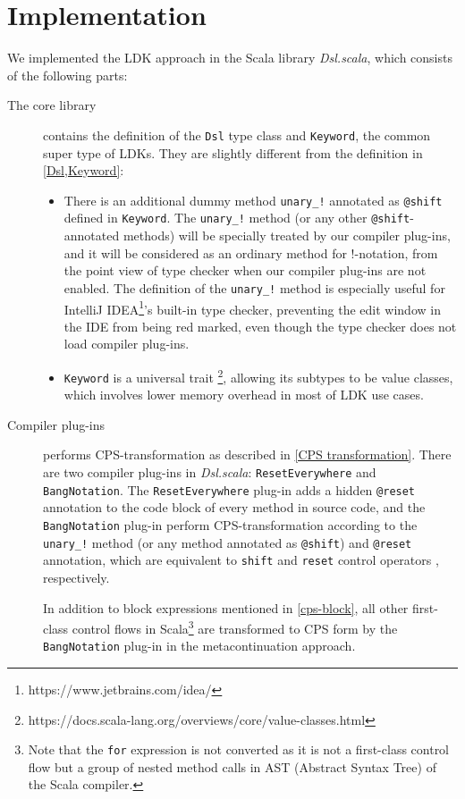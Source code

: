 \section{Implementation}\label{Implementation}

We implemented the LDK approach in the Scala library \textit{Dsl.scala}, which consists of the following parts:

\begin{description}
  \item[The core library] contains the definition of the \lstinline{Dsl} type class and \lstinline{Keyword}, the common super type of LDKs. They are slightly different from the definition in \cref{Dsl,Keyword}:
  \begin{itemize}
    \item There is an additional dummy method \lstinline{unary_!} annotated as \lstinline{@shift} defined in \lstinline{Keyword}. The \lstinline{unary_!} method (or any other \lstinline{@shift}-annotated methods) will be specially treated by our compiler plug-ins, and it will be considered as an ordinary method for !-notation, from the point view of type checker when our compiler plug-ins are not enabled. The definition of the \lstinline{unary_!} method is especially useful for IntelliJ IDEA\footnote{https://www.jetbrains.com/idea/}'s built-in type checker, preventing the edit window in the IDE from being red marked, even though the type checker does not load compiler plug-ins.
    \item \lstinline{Keyword} is a universal trait \footnote{https://docs.scala-lang.org/overviews/core/value-classes.html}, allowing its subtypes to be value classes, which involves lower memory overhead in most of LDK use cases.
  \end{itemize}
  \item[Compiler plug-ins] performs CPS-transformation as described in \cref{CPS transformation}. There are two compiler plug-ins in \textit{Dsl.scala}: \lstinline{ResetEverywhere} and \lstinline{BangNotation}. The \lstinline{ResetEverywhere} plug-in adds a hidden \lstinline{@reset} annotation to the code block of every method in source code, and the \lstinline{BangNotation} plug-in perform CPS-transformation according to the \lstinline{unary_!} method (or any method annotated as \lstinline{@shift}) and \lstinline{@reset} annotation, which are equivalent to \lstinline{shift} and \lstinline{reset} control operators \cite{danvy1989functional}, respectively.

  In addition to block expressions mentioned in \cref{cps-block}, all other first-class control flows in Scala\footnote{Note that the \lstinline{for} expression is not converted as it is not a first-class control flow but a group of nested method calls in AST (Abstract Syntax Tree) of the Scala compiler.} are transformed to CPS form by the \lstinline{BangNotation} plug-in in the metacontinuation \cite{Danvy1990AbstractingC} approach.


\end{description}
